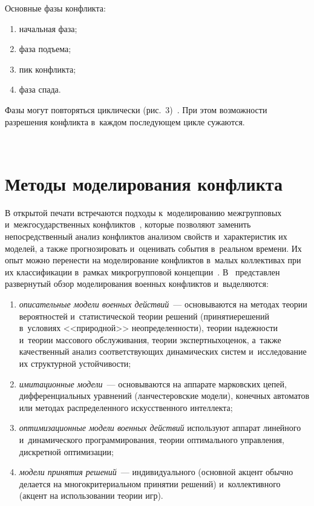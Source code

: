 \begin{multicols}{2}
  Основные фазы конфликта:
  \begin{enumerate}[(1)]
  \item  начальная фаза;
  \item  фаза подъема; 
  \item пик конфликта; 
\item фаза спада.
\end{enumerate}
Фазы могут повторяться циклически (рис.~3)~\cite{10-r}. При этом 
возможности разрешения конфликта в~каж\-дом последующем цикле сужаются.

 \begin{figure*}[b] %
\vspace*{1pt}
    \begin{center}  
  \mbox{%
 \epsfxsize=162.027mm 
 }
\end{center}
\vspace*{-9pt}
   \end{figure*}  

  
\section{Методы моделирования конфликта}

  В открытой печати встречаются подходы к~моделированию межгрупповых 
  и~межгосударственных конфликтов~\cite{11-r, 13-r, 14-r, 15-r}, которые 
позволяют заменить непосредственный анализ конфликтов анализом свойств 
и~характеристик их моделей, а также прогнозировать и~оценивать события 
в~реальном времени. Их опыт можно перенести на моделирование конфликтов 
в~малых коллективах при их классификации в~рамках микрогрупповой 
концепции~\cite{8-r}. В~\cite{5-r} представлен развернутый обзор 
моделирования военных конфликтов и~выделяются:
\begin{enumerate}[(1)]
\item \textit{описательные 
модели военных действий}~--- основываются на методах теории вероятностей 
и~статистической теории решений (принятие\linebreak решений в~условиях 
<<природной>> неопределенности), тео\-рии на\-деж\-ности и~тео\-рии массового 
обслуживания, тео\-рии экспертных\linebreak оценок, а~так\-же качественный анализ 
соответствующих динамических систем и~исследование их структурной 
устойчивости; 
\item \textit{имитационные модели}~--- основываются на аппарате 
марковских цепей, дифференциальных уравнений (ланчестеровские модели), 
конечных автоматов или методах распределенного искусственного интеллекта; 
\item \textit{оптимизационные модели военных действий} используют аппарат 
линейного и~динамического программирования, теории оптимального 
управления, дискретной оптимизации; 
\item \textit{модели принятия решений}~--- 
индивидуального (основной акцент обычно делается на многокритериальном 
принятии решений) и~коллективного (акцент на использовании теории игр). 
\end{enumerate}
  

\end{multicols}
